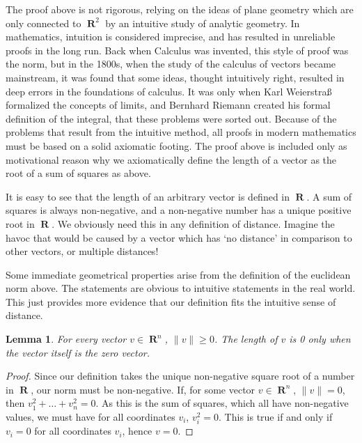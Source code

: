 \documentclass{report}
\newtheorem{lemma}[theorem]{Lemma}
\DeclareMathOperator{\real}{\mathbf{R}}
\begin{document}
The proof above is not rigorous, relying on the ideas of plane geometry which are only connected to $\real^2$ by an intuitive study of analytic geometry. In mathematics, intuition is considered imprecise, and has resulted in unreliable proofs in the long run. Back when Calculus was invented, this style of proof was the norm, but in the 1800s, when the study of the calculus of vectors became mainstream, it was found that some ideas, thought intuitively right, resulted in deep errors in the foundations of calculus. It was only when Karl Weierstra{\ss} formalized the concepts of limits, and Bernhard Riemann created his formal definition of the integral, that these problems were sorted out. Because of the problems that result from the intuitive method, all proofs in modern mathematics must be based on a solid axiomatic footing. The proof above is included only as motivational reason why we axiomatically define the length of a vector as the root of a sum of squares as above.

It is easy to see that the length of an arbitrary vector is defined in $\real$. A sum of squares is always non-negative, and a non-negative number has a unique positive root in $\real$. We obviously need this in any definition of distance. Imagine the havoc that would be caused by a vector which has `no distance' in comparison to other vectors, or multiple distances!

Some immediate geometrical properties arise from the definition of the euclidean norm above. The statements are obvious to intuitive statements in the real world. This just provides more evidence that our definition fits the intuitive sense of distance.

\begin{lemma}
  For every vector $v \in \real^n$, $\|v\| \geq 0$. The length of $v$ is 0 only when the vector itself is the zero vector.
\end{lemma}
\begin{proof}
  Since our definition takes the unique non-negative square root of a number in $\real$, our norm must be non-negative. If, for some vector $v \in \real^n$, $\| v \| = 0$, then $v_1^2 + \dots + v_n^2 = 0$. As this is the sum of squares, which all have non-negative values, we must have for all coordinates $v_i$, $v_i^2 = 0$. This is true if and only if $v_i = 0$ for all coordinates $v_i$, hence $v = 0$.
\end{proof}
\end{document}
